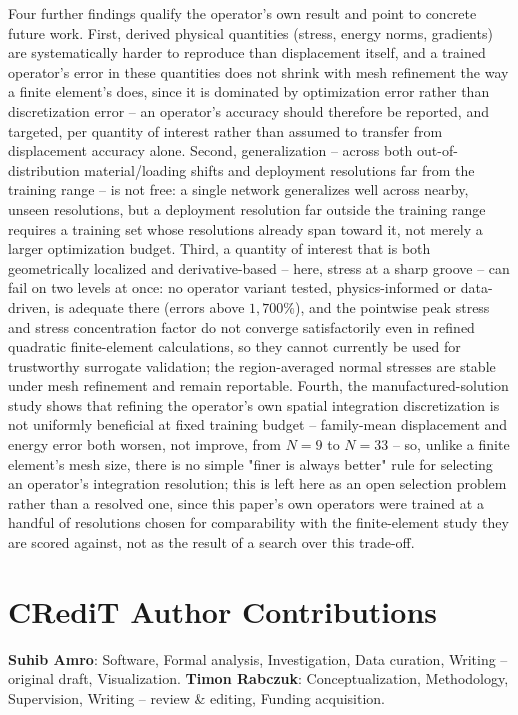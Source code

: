 \documentclass[final,5p,times]{elsarticle}
\begin{document}
Four further findings qualify the operator's own result and point to
concrete future work.
First, derived physical quantities (stress, energy norms, gradients) are
systematically harder to reproduce than displacement itself, and a trained
operator's error in these quantities does not shrink with mesh refinement
the way a finite element's does, since it is dominated by optimization
error rather than discretization error -- an operator's accuracy should
therefore be reported, and targeted, per quantity of interest rather than
assumed to transfer from displacement accuracy alone. Second,
generalization -- across both out-of-distribution material/loading shifts
and deployment resolutions far from the training range -- is not free:
a single network generalizes well across nearby, unseen resolutions, but
a deployment resolution far outside the training range requires a
training set whose resolutions already span toward it, not merely a larger
optimization budget. Third, a quantity of interest that is both
geometrically localized and derivative-based -- here, stress at a sharp
groove -- can fail on two levels at once: no operator variant tested,
physics-informed or data-driven, is adequate there (errors above
$1{,}700\%$), and the pointwise peak stress and stress concentration
factor do not converge satisfactorily even in refined quadratic
finite-element calculations, so they cannot currently be used for
trustworthy surrogate validation; the region-averaged normal stresses
are stable under mesh refinement and remain reportable. Fourth, the manufactured-solution study
shows that refining the operator's own spatial integration discretization
is not uniformly beneficial at fixed training budget -- family-mean
displacement and energy error both worsen, not improve, from $N{=}9$ to
$N{=}33$ -- so, unlike a finite element's mesh size, there is no simple
"finer is always better" rule for selecting an operator's integration
resolution; this is left here as an open selection problem rather than a
resolved one, since this paper's own operators were trained at a handful
of resolutions chosen for comparability with the finite-element study
they are scored against, not as the result of a search over this
trade-off.

\section*{CRediT Author Contributions}
\textbf{Suhib Amro}: Software, Formal analysis, Investigation, Data
curation, Writing -- original draft, Visualization.
\textbf{Timon Rabczuk}: Conceptualization, Methodology, Supervision,
Writing -- review \& editing, Funding acquisition.
\end{document}
